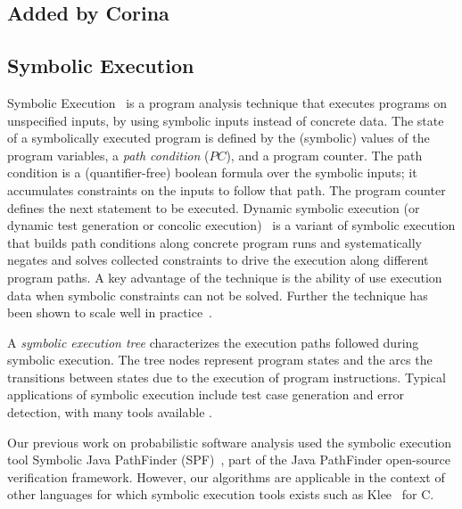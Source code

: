 \subsection{Added by Corina}
\subsection{Symbolic Execution}
Symbolic Execution~\cite{King1976,clarke76:system} is a program
analysis technique that executes programs on unspecified inputs, by
using symbolic inputs instead of concrete data. The state of a
symbolically executed program is defined by the (symbolic) values of
the program variables, a \emph{path condition} ($PC$), and a program
counter. The path condition is a (quantifier-free) boolean formula
over the symbolic inputs; it accumulates constraints on
the inputs to follow that path. The program counter defines the next
statement to be executed. Dynamic symbolic execution (or dynamic test generation or concolic execution)~\cite{godefroid05:dart,Cute,BitBlaze} is a variant of symbolic execution that builds path conditions along concrete program runs and systematically negates and solves collected constraints to drive the execution along different program paths. A key advantage of the technique is the ability of use execution data when symbolic constraints can not be solved. Further the technique has been shown to scale well in practice~\cite{SAGEsummaries}.

A \emph{symbolic execution tree} characterizes the execution paths
followed during symbolic execution. The tree nodes 
represent program states and the arcs the transitions between
states due to the execution of program instructions. Typical applications 
of symbolic execution include test case
generation and error detection, with many tools available
\cite{SPF,godefroid05:dart,tillman-halleux-tap2008,Klee}.

Our previous work on probabilistic software analysis used
the symbolic execution tool Symbolic Java PathFinder (SPF)~\cite{SPF}, 
part of the Java PathFinder open-source verification framework. 
However, our algorithms are applicable in the context
of other languages for which symbolic execution tools exists such as
Klee~\cite{Klee} for C. 

